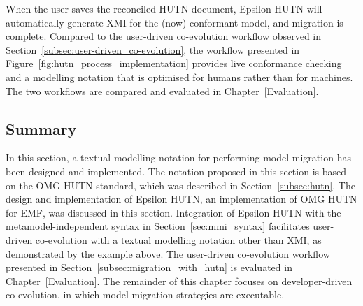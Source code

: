 When the user saves the reconciled HUTN document, Epsilon HUTN will automatically generate XMI for the (now) conformant model, and migration is complete. Compared to the user-driven co-evolution workflow observed in Section~\ref{subsec:user-driven_co-evolution}, the workflow presented in Figure~\ref{fig:hutn_process_implementation} provides live conformance checking and a modelling notation that is optimised for humans rather than for machines. The two workflows are compared and evaluated in Chapter~\ref{Evaluation}.

\subsection{Summary}
In this section, a textual modelling notation for performing model migration has been designed and implemented. The notation proposed in this section is based on the OMG HUTN standard, which was described in Section~\ref{subsec:hutn}. The design and implementation of Epsilon HUTN, an implementation of OMG HUTN for EMF, was discussed in this section. Integration of Epsilon HUTN with the metamodel-independent syntax in Section~\ref{sec:mmi_syntax} facilitates user-driven co-evolution with a textual modelling notation other than XMI, as demonstrated by the example above. The user-driven co-evolution workflow presented in Section~\ref{subsec:migration_with_hutn} is evaluated in Chapter~\ref{Evaluation}. The remainder of this chapter focuses on developer-driven co-evolution, in which model migration strategies are executable.